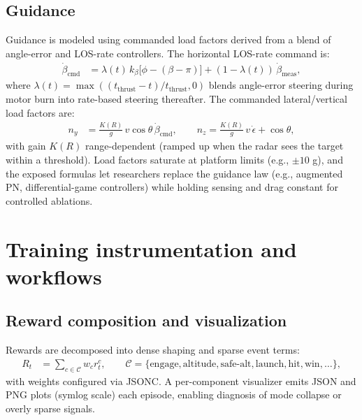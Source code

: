 \documentclass[11pt]{article}
\begin{document}
\subsection{Guidance}
Guidance is modeled using commanded load factors derived from a blend of angle-error and LOS-rate controllers. The horizontal LOS-rate command is:
\begin{align}
\dot{\beta}_{\text{cmd}} &= \lambda(t)\,k_\beta\big[\phi - (\beta - \pi)\big] + (1-\lambda(t))\,\dot{\beta}_{\text{meas}}, \label{eq:beta_cmd}
\end{align}
where $\lambda(t)=\max((t_{\text{thrust}}-t)/t_{\text{thrust}},0)$ blends angle-error steering during motor burn into rate-based steering thereafter. The commanded lateral/vertical load factors are:
\begin{align}
n_y &= \frac{K(R)}{g}\,v\cos\theta\,\dot{\beta}_{\text{cmd}}, \qquad
n_z = \frac{K(R)}{g}\,v\,\dot{\epsilon} + \cos\theta, \label{eq:load}
\end{align}
with gain $K(R)$ range-dependent (ramped up when the radar sees the target within a threshold). Load factors saturate at platform limits (e.g., $\pm 10$ g), and the exposed formulas let researchers replace the guidance law (e.g., augmented PN, differential-game controllers) while holding sensing and drag constant for controlled ablations.

\section{Training instrumentation and workflows}
\subsection{Reward composition and visualization}
Rewards are decomposed into dense shaping and sparse event terms:
\begin{align}
R_t &= \sum_{c\in\mathcal{C}} w_c r^c_t, \qquad \mathcal{C}=\{\text{engage},\text{altitude},\text{safe-alt},\text{launch},\text{hit},\text{win},\ldots\}, \label{eq:reward_sum}
\end{align}
with weights configured via JSONC. A per-component visualizer emits JSON and PNG plots (symlog scale) each episode, enabling diagnosis of mode collapse or overly sparse signals.
\end{document}
